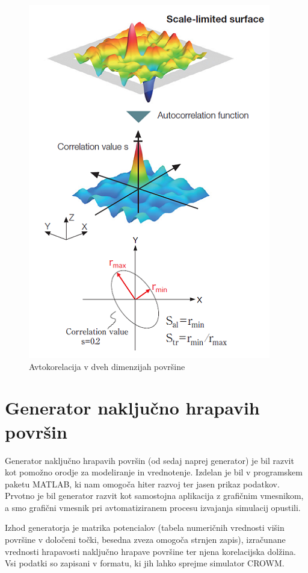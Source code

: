 \documentclass[a4paper,twoside,openright,12pt,slovene]{book}
\begin{document}
\begin{figure}[H]
    \centering
    \includegraphics[scale=0.45]{Slike/CL.png}
    \caption{Avtokorelacija v dveh dimenzijah površine \cite{real_SR}}
    \label{fig:Avtokorelacija}
\end{figure}






\chapter{Generator naključno hrapavih površin}

Generator naključno hrapavih površin (od sedaj naprej generator) je bil razvit kot pomožno orodje za modeliranje in vrednotenje. Izdelan je bil v programskem paketu MATLAB, ki nam omogoča hiter razvoj ter jasen prikaz podatkov. Prvotno je bil generator razvit kot samostojna aplikacija z grafičnim vmesnikom, a smo grafični vmesnik pri avtomatiziranem procesu izvajanja simulacij opustili.

Izhod generatorja je matrika potencialov (tabela numeričnih vrednosti višin površine v določeni točki, besedna zveza omogoča strnjen zapis), izračunane vrednosti hrapavosti naključno hrapave površine ter njena korelacijska dolžina. Vsi podatki so zapisani v formatu, ki jih lahko sprejme simulator CROWM.
\end{document}
